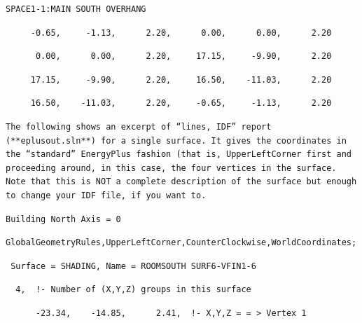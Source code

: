 \begin{lstlisting}
SPACE1-1:MAIN SOUTH OVERHANG
\end{lstlisting}

\begin{lstlisting}
     -0.65,     -1.13,      2.20,      0.00,      0.00,      2.20
\end{lstlisting}

\begin{lstlisting}
      0.00,      0.00,      2.20,     17.15,     -9.90,      2.20
\end{lstlisting}

\begin{lstlisting}
     17.15,     -9.90,      2.20,     16.50,    -11.03,      2.20
\end{lstlisting}

\begin{lstlisting}
     16.50,    -11.03,      2.20,     -0.65,     -1.13,      2.20
\end{lstlisting}

\begin{lstlisting}
The following shows an excerpt of “lines, IDF” report (**eplusout.sln**) for a single surface. It gives the coordinates in the “standard” EnergyPlus fashion (that is, UpperLeftCorner first and proceeding around, in this case, the four vertices in the surface. Note that this is NOT a complete description of the surface but enough to change your IDF file, if you want to.
\end{lstlisting}

\begin{lstlisting}
Building North Axis = 0
\end{lstlisting}

\begin{lstlisting}
GlobalGeometryRules,UpperLeftCorner,CounterClockwise,WorldCoordinates;
\end{lstlisting}

\begin{lstlisting}
 Surface = SHADING, Name = ROOMSOUTH SURF6-VFIN1-6
\end{lstlisting}

\begin{lstlisting}
  4,  !- Number of (X,Y,Z) groups in this surface
\end{lstlisting}

\begin{lstlisting}
      -23.34,    -14.85,      2.41,  !- X,Y,Z = = > Vertex 1
\end{lstlisting}

